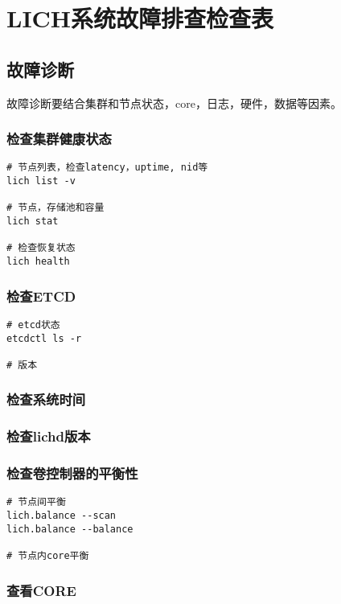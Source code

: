 \chapter{LICH系统故障排查检查表}

\section{故障诊断}

故障诊断要结合集群和节点状态，core，日志，硬件，数据等因素。

\subsection{检查集群健康状态}

\begin{lstlisting}
# 节点列表，检查latency，uptime, nid等
lich list -v

# 节点，存储池和容量
lich stat

# 检查恢复状态
lich health
\end{lstlisting}

\subsection{检查ETCD}

\begin{lstlisting}
# etcd状态
etcdctl ls -r

# 版本
\end{lstlisting}

\subsection{检查系统时间}

\subsection{检查lichd版本}

\subsection{检查卷控制器的平衡性}

\begin{lstlisting}
# 节点间平衡
lich.balance --scan
lich.balance --balance

# 节点内core平衡
\end{lstlisting}

\subsection{查看CORE}

